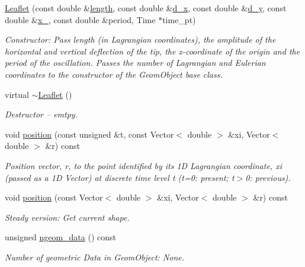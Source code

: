 \begin{DoxyCompactItemize}
\item 
\hyperlink{classLeaflet_acb53ccf4578a9981216cf0afd4b38453}{Leaflet} (const double \&\hyperlink{classLeaflet_a7a28827b7081107ac9e33087598ca868}{length}, const double \&\hyperlink{classLeaflet_a48e4d16790ffd9de527093eac8ff566c}{d\+\_\+x}, const double \&\hyperlink{classLeaflet_a8ff8044a3da540c7c9d7a89790b6ee58}{d\+\_\+y}, const double \&\hyperlink{classLeaflet_af4a819a3ba64960f4b796dc5a0d3eb5b}{x\+\_}, const double \&period, Time $\ast$time\+\_\+pt)
\begin{DoxyCompactList}\small\item\em Constructor\+: Pass length (in Lagrangian coordinates), the amplitude of the horizontal and vertical deflection of the tip, the x-\/coordinate of the origin and the period of the oscillation. Passes the number of Lagrangian and Eulerian coordinates to the constructor of the Geom\+Object base class. \end{DoxyCompactList}\item 
virtual \hyperlink{classLeaflet_a0bbfaeec2534389b203fd2a2316db859}{$\sim$\+Leaflet} ()
\begin{DoxyCompactList}\small\item\em Destructor -- emtpy. \end{DoxyCompactList}\item 
void \hyperlink{classLeaflet_a5b78c2735652b6a5c08c6aa9d38b6232}{position} (const unsigned \&t, const Vector$<$ double $>$ \&xi, Vector$<$ double $>$ \&r) const
\begin{DoxyCompactList}\small\item\em Position vector, r, to the point identified by its 1D Lagrangian coordinate, xi (passed as a 1D Vector) at discrete time level t (t=0\+: present; t$>$0\+: previous). \end{DoxyCompactList}\item 
void \hyperlink{classLeaflet_a01daf4944eaaf7e9697eac53d78965f5}{position} (const Vector$<$ double $>$ \&xi, Vector$<$ double $>$ \&r) const
\begin{DoxyCompactList}\small\item\em Steady version\+: Get current shape. \end{DoxyCompactList}\item 
unsigned \hyperlink{classLeaflet_a91f2460718ec5a4ef32e302b8b14cdca}{ngeom\+\_\+data} () const
\begin{DoxyCompactList}\small\item\em Number of geometric Data in Geom\+Object\+: None. \end{DoxyCompactList}\item 

\end{DoxyCompactItemize}
